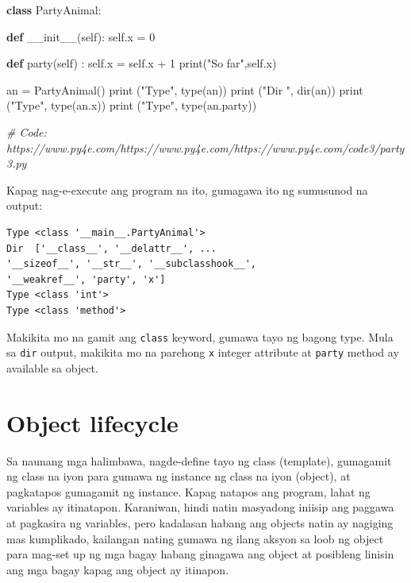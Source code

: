 \documentclass[10pt,]{book}
\newenvironment{Shaded}{}{}
\newcommand{\BuiltInTok}[1]{\textcolor[rgb]{0.00,0.50,0.00}{#1}}
\newcommand{\CommentTok}[1]{\textcolor[rgb]{0.38,0.63,0.69}{\textit{#1}}}
\newcommand{\DecValTok}[1]{\textcolor[rgb]{0.25,0.63,0.44}{#1}}
\newcommand{\FunctionTok}[1]{\textcolor[rgb]{0.02,0.16,0.49}{#1}}
\newcommand{\KeywordTok}[1]{\textcolor[rgb]{0.00,0.44,0.13}{\textbf{#1}}}
\newcommand{\NormalTok}[1]{#1}
\newcommand{\OperatorTok}[1]{\textcolor[rgb]{0.40,0.40,0.40}{#1}}
\newcommand{\StringTok}[1]{\textcolor[rgb]{0.25,0.44,0.63}{#1}}
\newcommand{\VariableTok}[1]{\textcolor[rgb]{0.10,0.09,0.49}{#1}}
\begin{document}
\begin{Shaded}
\begin{Highlighting}[]
\KeywordTok{class}\NormalTok{ PartyAnimal:}

   \KeywordTok{def} \FunctionTok{\_\_init\_\_}\NormalTok{(}\VariableTok{self}\NormalTok{):}
     \VariableTok{self}\NormalTok{.x }\OperatorTok{=} \DecValTok{0}

   \KeywordTok{def}\NormalTok{ party(}\VariableTok{self}\NormalTok{) :}
     \VariableTok{self}\NormalTok{.x }\OperatorTok{=} \VariableTok{self}\NormalTok{.x }\OperatorTok{+} \DecValTok{1}
     \BuiltInTok{print}\NormalTok{(}\StringTok{"So far"}\NormalTok{,}\VariableTok{self}\NormalTok{.x)}

\NormalTok{an }\OperatorTok{=}\NormalTok{ PartyAnimal()}
\BuiltInTok{print}\NormalTok{ (}\StringTok{"Type"}\NormalTok{, }\BuiltInTok{type}\NormalTok{(an))}
\BuiltInTok{print}\NormalTok{ (}\StringTok{"Dir "}\NormalTok{, }\BuiltInTok{dir}\NormalTok{(an))}
\BuiltInTok{print}\NormalTok{ (}\StringTok{"Type"}\NormalTok{, }\BuiltInTok{type}\NormalTok{(an.x))}
\BuiltInTok{print}\NormalTok{ (}\StringTok{"Type"}\NormalTok{, }\BuiltInTok{type}\NormalTok{(an.party))}

\CommentTok{\# Code: https://www.py4e.com/https://www.py4e.com/https://www.py4e.com/code3/party3.py}
\end{Highlighting}
\end{Shaded}

Kapag nag-e-execute ang program na ito, gumagawa ito ng sumusunod na
output:

{\small
\begin{verbatim}
Type <class '__main__.PartyAnimal'>
Dir  ['__class__', '__delattr__', ...
'__sizeof__', '__str__', '__subclasshook__',
'__weakref__', 'party', 'x']
Type <class 'int'>
Type <class 'method'>
\end{verbatim}
}

Makikita mo na gamit ang \texttt{class} keyword, gumawa tayo ng bagong
type. Mula sa \texttt{dir} output, makikita mo na parehong \texttt{x}
integer attribute at \texttt{party} method ay available sa object.

\section{Object lifecycle}\label{object-lifecycle}

  

Sa naunang mga halimbawa, nagde-define tayo ng class (template),
gumagamit ng class na iyon para gumawa ng instance ng class na iyon
(object), at pagkatapos gumagamit ng instance. Kapag natapos ang
program, lahat ng variables ay itinatapon. Karaniwan, hindi natin
masyadong iniisip ang paggawa at pagkasira ng variables, pero kadalasan
habang ang objects natin ay nagiging mas kumplikado, kailangan nating
gumawa ng ilang aksyon sa loob ng object para mag-set up ng mga bagay
habang ginagawa ang object at posibleng linisin ang mga bagay kapag ang
object ay itinapon.
\end{document}
